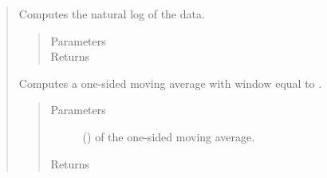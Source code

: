 \documentclass[letterpaper,10pt,openany,oneside,english]{sphinxmanual}
\begin{document}
\begin{fulllineitems}
\begin{quote}
\begin{fulllineitems}
\begin{quote}
\begin{description}
\end{description}\end{quote}

\end{fulllineitems}


\begin{fulllineitems}
\label{\detokenize{series_class:fredpy.series.log}}
Computes the natural log of the data.
\begin{quote}\begin{description}
\item[{Parameters}] \leavevmode
\item[{Returns}] \leavevmode
{\hyperref[\detokenize{series_class:fredpy.series}]{}}

\end{description}\end{quote}

\end{fulllineitems}


\begin{fulllineitems}
\label{\detokenize{series_class:fredpy.series.ma1side}}
Computes a one-sided moving average with window equal to .
\begin{quote}\begin{description}
\item[{Parameters}] \leavevmode
{} () \textendash{}  of the one-sided moving average.

\item[{Returns}] \leavevmode
{\hyperref[\detokenize{series_class:fredpy.series}]{}}

\end{description}\end{quote}


\end{fulllineitems}
\end{quote}
\end{fulllineitems}
\end{document}
